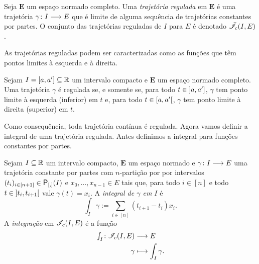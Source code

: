 \begin{definition}
Seja $\bm E$ um espaço normado completo. Uma \emph{trajetória regulada} em $\bm E$ é uma trajetória $\gamma\colon \allowbreak I \longrightarrow E$ que é limite de alguma sequência de trajetórias constantes por partes. O conjunto das trajetórias reguladas de $I$ para $E$ é denotado $\bar{\mathscr{I}}_{c}(I,E)$.
\end{definition}

As trajetórias reguladas podem ser caracterizadas como as funções que têm pontos limites à esquerda e à direita.
\begin{exercise}
Sejam $I = \left[a,\allowbreak a'\right] \subseteq \mathbb{R}$ um intervalo compacto e $\bm E$ um espaço normado completo. Uma trajetória $\gamma$ é regulada se, e somente se, para todo $t \in \left]a,\allowbreak a'\right]$, $\gamma$ tem ponto limite à esquerda (inferior) em $t$ e, para todo $t \in \left[a,\allowbreak a'\right[$, $\gamma$ tem ponto limite à direita (superior) em $t$.
\end{exercise}

Como consequência, toda trajetória contínua é regulada. Agora vamos definir a integral de uma trajetória regulada. Antes definimos a integral para funções constantes por partes.

\begin{definition}
Sejam $I \subseteq \mathbb{R}$ um intervalo compacto, $\bm E$ um espaço normado e $\gamma\colon \allowbreak I \longrightarrow E$ uma trajetória constante por partes com $n$-partição por por intervalos $(t_i)_{i \in [n+1]} \in \Partinter(I)$ e $x_0, \ldots, x_{n-1} \in E$ tais que, para todo $i \in [n]$ e todo $t \in \left]t_i,\allowbreak t_{i+1}\right[$ vale $\gamma(t) = x_i$.
A \emph{integral de $\gamma$ em $I$} é
	\begin{equation*}
	\int_I \gamma := \sum_{i \in [n]} (t_{i+1} - t_i) x_i.
	\end{equation*}
A \emph{integração} em $\mathscr{I}_{c}(I,E)$ é a função
	\begin{align*}
	{\textstyle\int_I}\colon {\mathscr{I}_{c}(I,E)} &\longrightarrow {E} \\{\gamma} &\longmapsto \int_I \gamma.
	\end{align*}
\end{definition}

